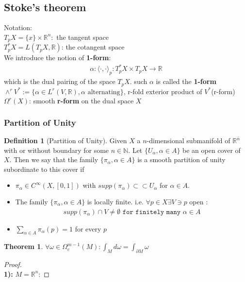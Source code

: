 \documentclass[12pt,fleqn]{book}
\newtheorem{theorem}{Theorem}[section]
\theoremstyle{definition}
\newtheorem{definition}{Definition}[section]
\begin{document}
\subsection{Stoke's theorem}
Notation:\\
$T_pX = \{x\} \times \mathbb{R}^n:$ the tangent space\\
$T_p^*X = L(T_pX, \mathbb{R})$: the cotangent space\\
We introduce the notion of \textbf{1-form}:
\begin{align*}
	\alpha: \langle \cdot , \cdot  \rangle_p: T_p^*X \times T_pX \rightarrow \mathbb{R}
\end{align*}
which is the dual pairing of the space $T_pX$. such $\alpha$ is called the \textbf{1-form} \\
$\wedge^r V^*:= \big\{\alpha \in L^r (V, \mathbb{R}), \alpha \text{ alternating}\big\}$, r-fold exterior product of $V^*$(r-form)\\
$\Omega^r(X)$: smooth \textbf{r-form} on the dual space $X$

\subsubsection*{Partition of Unity}
\begin{definition}[Partition of Unity]
	Given $X$ a $n$-dimensional submanifold of $\mathbb{R}^{\bar{n}}$ with or without boundary for some $n \in \mathbb{N}$. Let $\{U_\alpha, \alpha \in A\}$ be an open cover of $X$. Then we say that the family $\{\pi_\alpha, \alpha \in A\}$ is a smooth partition of unity subordinate to this cover if
	\begin{itemize}
		\item $\pi_\alpha \in C^\infty(X, [0, 1])$ with $supp(\pi_\alpha) \subset \subset U_\alpha$ for $\alpha \in A$.
		\item The family $\{\pi_\alpha, \alpha \in A\}$ is locally finite. i.e. $\forall p \in X \exists V \ni p$ open :
			\begin{align*}
				supp(\pi_\alpha) \cap V \neq \emptyset \texttt{ for finitely many } \alpha \in A
			\end{align*}
		\item $\sum_{\alpha \in A} \pi_\alpha(p) = 1$ for every $p$
	\end{itemize}
\end{definition}


\begin{theorem}
	$\forall \omega \in \Omega_c^{m -1}(M): \int_M d\omega  = \int_{\partial M} \omega $
\end{theorem}
\begin{proof}
	\quad\\
	\textbf{1):} $M = \mathbb{R}^n$: 
\end{proof}
\end{document}

